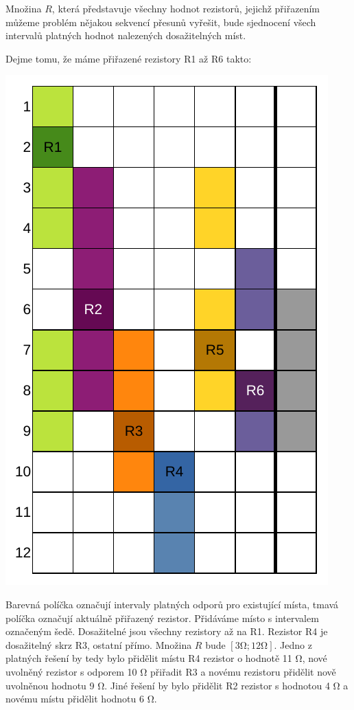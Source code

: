\documentclass{article}
\begin{document}
Množina $R$, která představuje všechny hodnot rezistorů, jejichž přiřazením můžeme problém nějakou sekvencí přesunů vyřešit, bude sjednocení všech intervalů platných hodnot nalezených dosažitelných míst.

Dejme tomu, že máme přiřazené rezistory R1 až R6 takto:

\begin{center}
    \includegraphics{intervals.pdf}
\end{center}

Barevná políčka označují intervaly platných odporů pro existující místa, tmavá políčka označují aktuálně přiřazený rezistor. Přidáváme místo s intervalem označeným šedě. Dosažitelné jsou všechny rezistory až na R1. Rezistor R4 je dosažitelný skrz R3, ostatní přímo. Množina $R$ bude $\left[3 \unit{\ohm}; 12 \unit{\ohm}\right]$. Jedno z platných řešení by tedy bylo přidělit místu R4 rezistor o hodnotě 11 \unit{\ohm}, nové uvolněný rezistor s odporem 10 \unit{\ohm} přiřadit R3 a novému rezistoru přidělit nově uvolněnou hodnotu 9 \unit{\ohm}. Jiné řešení by bylo přidělit R2 rezistor s hodnotou 4 \unit{\ohm} a novému místu přidělit hodnotu 6 \unit{\ohm}.
\end{document}

